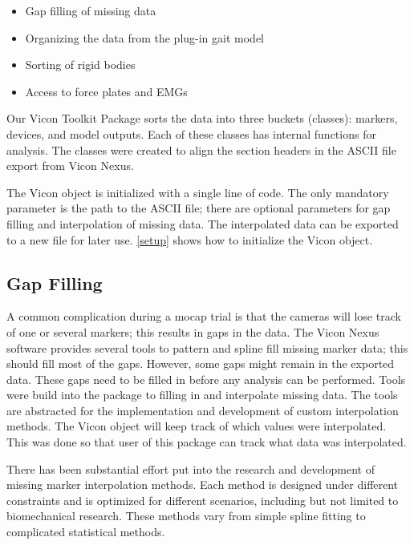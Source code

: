 \begin{itemize}[noitemsep]
    \item Gap filling of missing data 
    \item Organizing the data from the plug-in gait model 
    \item Sorting of rigid bodies
    \item Access to force plates and EMGs 
\end{itemize}


Our Vicon Toolkit Package sorts the data into three buckets (classes): markers, devices, and model outputs. Each of these classes has internal functions for analysis. The classes were created to align the section headers in the ASCII file export from Vicon Nexus. 

The Vicon object is initialized with a single line of code. The only mandatory parameter is the path to the ASCII file; there are optional parameters for gap filling and interpolation of missing data. The interpolated data can be exported to a new file for later use.  \autoref{setup} shows how to initialize the Vicon object.




\subsection{Gap Filling}

A common complication during a mocap trial is that the cameras will lose track of one or several markers; this results in gaps in the data. The Vicon Nexus software provides several tools to pattern and spline fill missing marker data; this should fill most of the gaps. However, some gaps might remain in the exported data. These gaps need to be filled in before any analysis can be performed. Tools were build into the package to filling in and interpolate missing data. The tools are abstracted for the implementation and development of custom interpolation methods. The Vicon object will keep track of which values were interpolated. This was done so that user of this package can track what data was interpolated. 


There has been substantial effort put into the research and development of missing marker interpolation methods. Each method is designed under different constraints and is optimized for different scenarios, including but not limited to biomechanical research. These methods vary from simple spline fitting to complicated statistical methods. 

